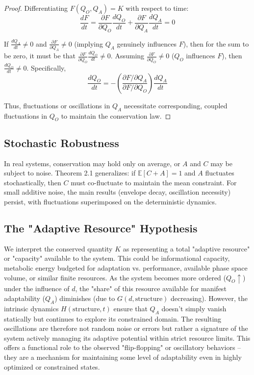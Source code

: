 \documentclass[11pt,a4paper]{article}
\begin{document}
\begin{proof}
Differentiating $F(Q_O, Q_A) = K$ with respect to time:
\begin{equation}
    \frac{dF}{dt} = \frac{\partial F}{\partial Q_O}\frac{dQ_O}{dt} + \frac{\partial F}{\partial Q_A}\frac{dQ_A}{dt} = 0
\end{equation}

If $\frac{dQ_A}{dt} \neq 0$ and $\frac{\partial F}{\partial Q_A} \neq 0$ (implying $Q_A$ genuinely influences $F$), then for the sum to be zero, it must be that $\frac{\partial F}{\partial Q_O}\frac{dQ_O}{dt} \neq 0$. Assuming $\frac{\partial F}{\partial Q_O} \neq 0$ ($Q_O$ influences $F$), then $\frac{dQ_O}{dt} \neq 0$. Specifically,
\begin{equation}
    \frac{dQ_O}{dt} = - \left(\frac{\partial F/\partial Q_A}{\partial F/\partial Q_O}\right) \frac{dQ_A}{dt}
\end{equation}

Thus, fluctuations or oscillations in $Q_A$ necessitate corresponding, coupled fluctuations in $Q_O$ to maintain the conservation law.
\end{proof}

\subsection{Stochastic Robustness}
In real systems, conservation may hold only on average, or $ A $ and $ C $ may be subject to noise.
Theorem 2.1 generalizes: if $ \mathbb{E}[C+A]=1 $ and $ A $ fluctuates stochastically, then $ C $ must co-fluctuate to maintain the mean constraint.
For small additive noise, the main results (envelope decay, oscillation necessity) persist, with fluctuations superimposed on the deterministic dynamics.

\subsection{The "Adaptive Resource" Hypothesis}

We interpret the conserved quantity $K$ as representing a total "adaptive resource" or "capacity" available to the system. This could be informational capacity, metabolic energy budgeted for adaptation vs. performance, available phase space volume, or similar finite resources. As the system becomes more ordered ($Q_O \uparrow$) under the influence of $d$, the "share" of this resource available for manifest adaptability ($Q_A$) diminishes (due to $G(d, \text{structure})$ decreasing). However, the intrinsic dynamics $H(\text{structure}, t)$ ensure that $Q_A$ doesn't simply vanish statically but continues to explore its constrained domain. The resulting oscillations are therefore not random noise or errors but rather a signature of the system actively managing its adaptive potential within strict resource limits. This offers a functional role to the observed "flip-flopping" or oscillatory behaviors – they are a mechanism for maintaining some level of adaptability even in highly optimized or constrained states.
\end{document}
